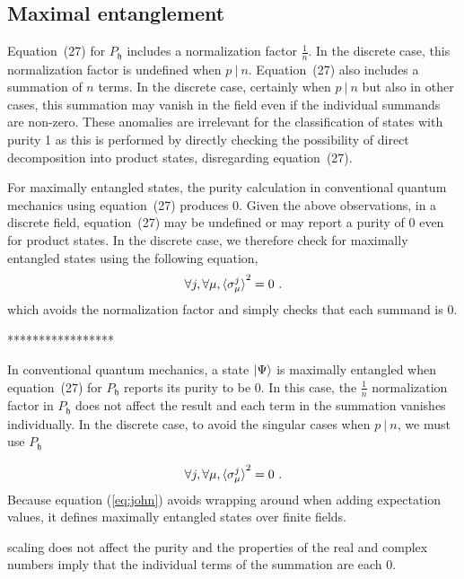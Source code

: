 \documentclass{iopart}
\def\fh{\mathfrak{h}}
\begin{document}
\subsection{Maximal entanglement}

Equation~(27) for $P_{\fh}$ includes a normalization factor $\frac{1}{n}$. In the discrete case, this normalization factor is undefined when $p ~|~ n$. Equation~(27) also includes a summation of $n$ terms. In the discrete case, certainly when $p ~|~ n$ but also in other cases, this summation may vanish in the field even if the individual summands are non-zero. These anomalies are irrelevant for the classification of states with purity 1 as this is performed by directly checking the possibility of direct decomposition into product states, disregarding equation~(27). 

For maximally entangled states, the purity calculation in conventional quantum mechanics using equation~(27) produces 0. Given the above observations, in a discrete field, equation~(27) may be undefined or may report a purity of 0 even for product states. In the discrete case, we therefore check for maximally entangled states using the following equation,
\begin{equation}
\forall j,\forall\mu,\braket{\sigma_{\mu}^{j}}^2 =0\textrm{ .}\label{eq:john}
\end{equation}
which avoids the normalization factor and simply checks that each summand is 0. 





\bigskip
\bigskip
\bigskip
*****************


In conventional quantum mechanics, a state $\ket{\Psi}$ is maximally entangled
when equation~(27) for $P_{\fh}$ reports its purity to be 0. In this case, the $\frac{1}{n}$ normalization factor in $P_{\fh}$ does not affect the result and each term in the summation vanishes individually. In the discrete case, to avoid the singular cases when $p ~|~ n$, we must use $P_{\fh}$ 

\begin{equation}
\forall j,\forall\mu,\braket{\sigma_{\mu}^{j}}^2 =0\textrm{ .}\label{eq:john}
\end{equation}
Because equation (\ref{eq:john}) avoids wrapping around when adding
expectation values, it defines maximally entangled states over finite
fields.





scaling does not affect the purity and the
properties of the real and complex numbers imply that the individual terms of the summation are each 0. 
\end{document}

